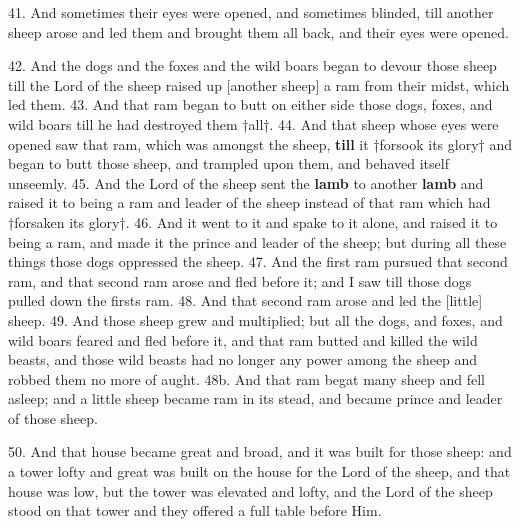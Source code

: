 
41. And sometimes their eyes were opened, and
sometimes blinded, till another sheep arose and led
them and brought them all back, and their eyes were
opened.

42. And the dogs and the foxes and the wild boars
began to devour those sheep till the Lord of the sheep
raised up [another sheep] a ram from their midst,
which led them. 43. And that ram began to butt on
either side those dogs, foxes, and wild boars till he
had destroyed them †all†. 44. And that sheep whose
eyes were opened saw that ram, which was amongst
the sheep, \textbf{till} it †forsook its glory† and began to butt
those sheep, and trampled upon them, and behaved
itself unseemly. 45. And the Lord of the sheep sent
the \textbf{lamb} to another \textbf{lamb} and raised it to being a
ram and leader of the sheep instead of that ram which
had †forsaken its glory†. 46. And it went to it and
spake to it alone, and raised it to being a ram, and
made it the prince and leader of the sheep; but during
all these things those dogs oppressed the sheep.
47. And the first ram pursued that second ram, and
that second ram arose and fled before it; and I saw
till those dogs pulled down the firsts ram. 48. And
that second ram arose and led the [little] sheep.
49. And those sheep grew and multiplied; but all the
dogs, and foxes, and wild boars feared and fled before
it, and that ram butted and killed the wild beasts, and
those wild beasts had no longer any power among the
sheep and robbed them no more of aught. 48b. And
that ram begat many sheep and fell asleep; and a
little sheep became ram in its stead, and became
prince and leader of those sheep.

50. And that house became great and broad, and
it was built for those sheep: and a tower lofty and
great was built on the house for the Lord of the sheep,
and that house was low, but the tower was elevated
and lofty, and the Lord of the sheep stood on that
tower and they offered a full table before Him.


